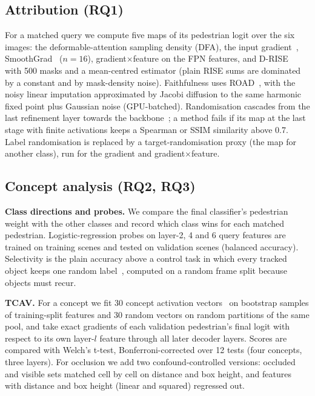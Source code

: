 \documentclass[journal]{IEEEtran}
\newcommand{\RQ}[1]{\textbf{RQ#1}}
\begin{document}
\subsection{Attribution (\RQ1)}
For a matched query we compute five maps of its pedestrian logit over the six images: the deformable-attention
sampling density (DFA), the input gradient~\cite{simonyan2014saliency}, SmoothGrad~\cite{smilkov2017smoothgrad}
($n{=}16$), gradient$\times$feature on the FPN features, and D-RISE~\cite{petsiuk2021drise} with 500 masks and a
mean-centred estimator (plain RISE sums are dominated by a constant and by mask-density noise). Faithfulness uses
ROAD~\cite{rong2022road}, with the noisy linear imputation approximated by Jacobi diffusion to the same harmonic
fixed point plus Gaussian noise (GPU-batched). Randomisation cascades from the last refinement layer towards the
backbone~\cite{adebayo2018sanity}; a method fails if its map at the last stage with finite activations keeps a Spearman
or SSIM similarity above 0.7. Label randomisation is replaced by a target-randomisation proxy (the map for another
class), run for the gradient and gradient$\times$feature.

\subsection{Concept analysis (\RQ2, \RQ3)}
\textbf{Class directions and probes.} We compare the final classifier's pedestrian weight with the other classes and
record which class wins for each matched pedestrian. Logistic-regression probes on layer-2, 4 and 6 query features are
trained on training scenes and tested on validation scenes (balanced accuracy). Selectivity is the plain accuracy
above a control task in which every tracked object keeps one random label~\cite{hewitt2019control}, computed on a
random frame split because objects must recur.

\textbf{TCAV.} For a concept we fit 30 concept activation vectors~\cite{kim2018tcav} on bootstrap samples of
training-split features and 30 random vectors on random partitions of the same pool, and take exact gradients of each
validation pedestrian's final logit with respect to its own layer-$l$ feature through all later decoder layers. Scores
are compared with Welch's t-test, Bonferroni-corrected over 12 tests (four concepts, three layers). For occlusion we
add two confound-controlled versions: occluded and visible sets matched cell by cell on distance and box height, and
features with distance and box height (linear and squared) regressed out.
\end{document}
